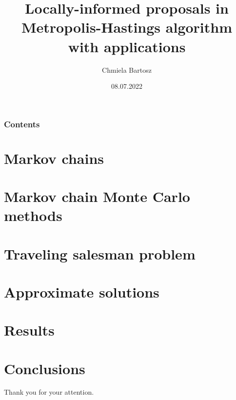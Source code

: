 



\title[LIP]{Locally-informed proposals in Metropolis-Hastings algorithm with applications}
\author[B.Chmiela]{Chmiela Bartosz}
\date{08.07.2022}



	\begin{frame}
		\titlepage
	\end{frame}
	
	\begin{frame}
		\frametitle{Contents}
		\tableofcontents
	\end{frame}

	\section{Markov chains}
		
	
	\section[MCMC]{Markov chain Monte Carlo methods}
		
	
	\section[TSP]{Traveling salesman problem}
		
	
	\section{Approximate solutions}
		
	
	\section{Results}
		

	\section{Conclusions}
		
		
	
	\begin{frame}
		\centering
		Thank you for your attention.
	\end{frame}

	
